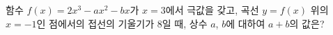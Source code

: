 함수 $f(x)=2x^3-ax^2-bx$가 $x=3$에서 극값을 갖고, 곡선 $y=f(x)$ 위의 $x=-1$인 점에서의 접선의 기울기가 $8$일 때, 상수 $a$, $b$에 대하여 $a+b$의 값은?
